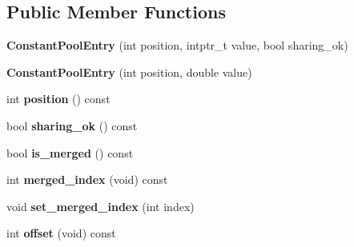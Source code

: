\subsection*{Public Member Functions}
\begin{DoxyCompactItemize}
\item 
{\bfseries Constant\+Pool\+Entry} (int position, intptr\+\_\+t value, bool sharing\+\_\+ok)\hypertarget{classv8_1_1internal_1_1_constant_pool_entry_a7fb565350c4a308975044d7154786f6c}{}\label{classv8_1_1internal_1_1_constant_pool_entry_a7fb565350c4a308975044d7154786f6c}

\item 
{\bfseries Constant\+Pool\+Entry} (int position, double value)\hypertarget{classv8_1_1internal_1_1_constant_pool_entry_a80efd5b10c5fa606b1bac9d959142941}{}\label{classv8_1_1internal_1_1_constant_pool_entry_a80efd5b10c5fa606b1bac9d959142941}

\item 
int {\bfseries position} () const \hypertarget{classv8_1_1internal_1_1_constant_pool_entry_a4ac9a12ca911ed36f9ea5378c8879758}{}\label{classv8_1_1internal_1_1_constant_pool_entry_a4ac9a12ca911ed36f9ea5378c8879758}

\item 
bool {\bfseries sharing\+\_\+ok} () const \hypertarget{classv8_1_1internal_1_1_constant_pool_entry_ab18225c1ab02d7a0e4dcf60f01d64214}{}\label{classv8_1_1internal_1_1_constant_pool_entry_ab18225c1ab02d7a0e4dcf60f01d64214}

\item 
bool {\bfseries is\+\_\+merged} () const \hypertarget{classv8_1_1internal_1_1_constant_pool_entry_ad77e21399b740c5fe0b25b5645d88360}{}\label{classv8_1_1internal_1_1_constant_pool_entry_ad77e21399b740c5fe0b25b5645d88360}

\item 
int {\bfseries merged\+\_\+index} (void) const \hypertarget{classv8_1_1internal_1_1_constant_pool_entry_a7eff0b750e97671edc516e0454aaa544}{}\label{classv8_1_1internal_1_1_constant_pool_entry_a7eff0b750e97671edc516e0454aaa544}

\item 
void {\bfseries set\+\_\+merged\+\_\+index} (int index)\hypertarget{classv8_1_1internal_1_1_constant_pool_entry_a5990c4b32551a11641b0bcc894fe8fd4}{}\label{classv8_1_1internal_1_1_constant_pool_entry_a5990c4b32551a11641b0bcc894fe8fd4}

\item 
int {\bfseries offset} (void) const \hypertarget{classv8_1_1internal_1_1_constant_pool_entry_afedadd719cbf0b483add1e3f5afcf140}{}\label{classv8_1_1internal_1_1_constant_pool_entry_afedadd719cbf0b483add1e3f5afcf140}


\end{DoxyCompactItemize}
